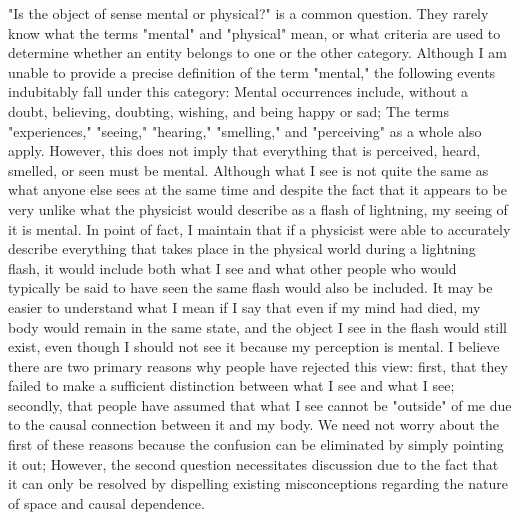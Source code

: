 \documentclass[a4paper,12pt]{book}[2004/02/16]
\theoremstyle{ilemma}
\theoremstyle{itheorem}
\theoremstyle{iother}
\theoremstyle{icorollary}
\theoremstyle{numcorollary}
\theoremstyle{idefinition}
\begin{document}
"Is the object of sense mental or physical?" is a common question. They rarely know what the terms "mental" and "physical" mean, or what criteria are used to determine whether an entity belongs to one or the other category. Although I am unable to provide a precise definition of the term "mental," the following events indubitably fall under this category:
Mental occurrences include, without a doubt, believing, doubting, wishing, and being happy or sad; The terms "experiences," "seeing," "hearing," "smelling," and "perceiving" as a whole also apply. However, this does not imply that everything that is perceived, heard, smelled, or seen must be mental. Although what I see is not quite the same as what anyone else sees at the same time and despite the fact that it appears to be very unlike what the physicist would describe as a flash of lightning, my seeing of it is mental. In point of fact, I maintain that if a physicist were able to accurately describe everything that takes place in the physical world during a lightning flash, it would include both what I see and what other people who would typically be said to have seen the same flash would also be included. It may be easier to understand what I mean if I say that even if my mind had died, my body would remain in the same state, and the object I see in the flash would still exist, even though I should not see it because my perception is mental. I believe there are two primary reasons why people have rejected this view: first, that they failed to make a sufficient distinction between what I see and what I see; secondly, that people have assumed that what I see cannot be "outside" of me due to the causal connection between it and my body. We need not worry about the first of these reasons because the confusion can be eliminated by simply pointing it out; However, the second question necessitates discussion due to the fact that it can only be resolved by dispelling existing misconceptions regarding the nature of space and causal dependence.
\end{document}
